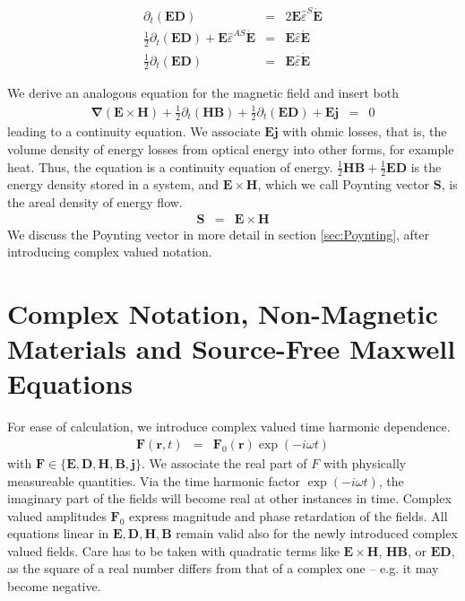 \documentclass[12pt,a4paper,twoside,openright,BCOR10mm,headsepline,titlepage,abstracton,chapterprefix,final]{scrreprt}
\newcommand\Vector[1]{{\mathbf{#1}}}
\newcommand\Nabla{\Vector{\nabla}}
\newcommand\timederivative[1]{\dot{{#1}}}
\newcommand\Tensor[1]{\hat{#1}}
\newcommand\scalarEfield{E}
\newcommand\scalarBfield{B}
\newcommand\scalarHfield{H}
\newcommand\scalarDfield{D}
\newcommand\Efield{\Vector{\scalarEfield}}
\newcommand\Bfield{\Vector{\scalarBfield}}
\newcommand\Hfield{\Vector{\scalarHfield}}
\newcommand\Dfield{\Vector{\scalarDfield}}
\newcommand\permittivity{\Tensor{\scalarpermittivity}}
\newcommand\scalarpermittivity{\varepsilon}
\newcommand\currentdensity{\Vector{j}}
\begin{document}
\begin{eqnarray}
 \partial_t (\Efield \Dfield)                                                                  &=& 2 \Efield \permittivity^S \timederivative{\Efield} \\
 \frac{1}{2} \partial_t (\Efield \Dfield)+ \Efield \permittivity^{AS} \timederivative{\Efield} &=&   \Efield  \permittivity \timederivative{\Efield} \\
 \frac{1}{2} \partial_t (\Efield \Dfield)                                                      &=&   \Efield  \permittivity \timederivative{\Efield}
\end{eqnarray}

We derive an analogous equation for the magnetic field and insert both
\begin{eqnarray}
   \Nabla ( \Efield \times \Hfield ) + \frac{1}{2} \partial_t (\Hfield \Bfield) + \frac{1}{2} \partial_t (\Efield \Dfield) + \Efield \currentdensity &=& 0
\end{eqnarray}
leading to a continuity equation. 
We associate $\Efield \currentdensity$ with ohmic losses, that is, the volume density of energy losses from optical energy into other forms, for example heat.
Thus, the equation is a continuity equation of energy.
$\frac{1}{2} \Hfield \Bfield + \frac{1}{2} \Efield \Dfield$ is the energy density stored in a system, 
and $\Efield \times \Hfield$, which we call Poynting vector $\Vector{S}$, is the areal density of energy flow.
\begin{eqnarray}
 \Vector{S} &=& \Efield \times \Hfield
 \label{eq:definitionOfPoynting}
\end{eqnarray}
We discuss the Poynting vector in more detail in section \ref{sec:Poynting}, after introducing complex valued notation.

\section{Complex Notation, Non-Magnetic Materials and Source-Free Maxwell Equations}
\label{sec:sourcefreemaxwell}
For ease of calculation, we introduce complex valued time harmonic dependence.
\begin{eqnarray}
 \Vector{F}(\Vector{r},t) &=& \Vector{F}_0(\Vector{r}) \exp(-i \omega t)
\end{eqnarray}
with $\Vector{F} \in \{ \Efield, \Dfield, \Hfield, \Bfield, \currentdensity \}$.
We associate the real part of $F$ with physically measureable quantities. 
Via the time harmonic factor $\exp(-i \omega t)$, the imaginary part of the fields will become real at other instances in time.
Complex valued amplitudes $\Vector{F}_0$ express magnitude and phase retardation of the fields.
All equations linear in $\Efield,\Dfield,\Hfield,\Bfield$ remain valid also for the newly introduced complex valued fields.
Care has to be taken with quadratic terms like $\Efield \times \Hfield$, $\Hfield \Bfield$, or $\Efield \Dfield$,
as the square of a real number differs from that of a complex one -- e.g. it may become negative.
\end{document}
